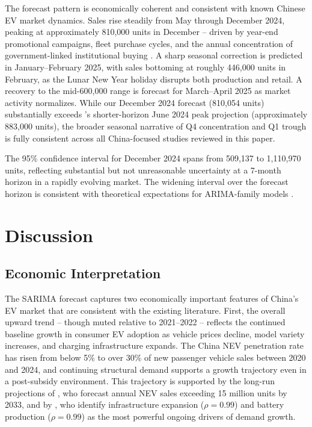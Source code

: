 \documentclass[12pt]{article}
\begin{document}
The forecast pattern is economically coherent and consistent with known Chinese EV market dynamics. Sales rise steadily from May through December 2024, peaking at approximately 810,000 units in December -- driven by year-end promotional campaigns, fleet purchase cycles, and the annual concentration of government-linked institutional buying \citep{chen2025, liang2025}. A sharp seasonal correction is predicted in January--February 2025, with sales bottoming at roughly 446,000 units in February, as the Lunar New Year holiday disrupts both production and retail. A recovery to the mid-600,000 range is forecast for March--April 2025 as market activity normalizes. While our December 2024 forecast (810,054 units) substantially exceeds \citet{chen2025}'s shorter-horizon June 2024 peak projection (approximately 883,000 units), the broader seasonal narrative of Q4 concentration and Q1 trough is fully consistent across all China-focused studies reviewed in this paper.

The 95\% confidence interval for December 2024 spans from 509,137 to 1,110,970 units, reflecting substantial but not unreasonable uncertainty at a 7-month horizon in a rapidly evolving market. The widening interval over the forecast horizon is consistent with theoretical expectations for ARIMA-family models \citep{chen2025, cetin2024}.

\section{Discussion}
\label{sec:discussion}

\subsection{Economic Interpretation}

The SARIMA forecast captures two economically important features of China's EV market that are consistent with the existing literature. First, the overall upward trend -- though muted relative to 2021--2022 -- reflects the continued baseline growth in consumer EV adoption as vehicle prices decline, model variety increases, and charging infrastructure expands. The China NEV penetration rate has risen from below 5\% to over 30\% of new passenger vehicle sales between 2020 and 2024, and continuing structural demand supports a growth trajectory even in a post-subsidy environment. This trajectory is supported by the long-run projections of \citet{ge2024}, who forecast annual NEV sales exceeding 15 million units by 2033, and by \citet{yang2024}, who identify infrastructure expansion ($\rho = 0.99$) and battery production ($\rho = 0.99$) as the most powerful ongoing drivers of demand growth.
\end{document}
